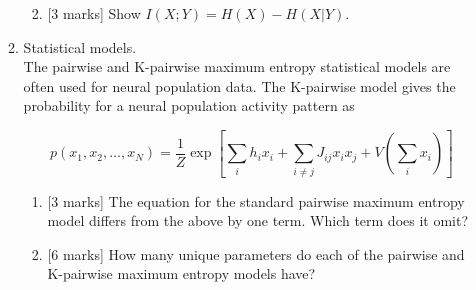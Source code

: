 \documentclass{article}
\newif\ifanswer
\begin{document}
\begin{enumerate}
\begin{enumerate}
\begin{enumerate}
  \fi

\item{}[3 marks] Show $I(X;Y)=H(X)-H(X|Y)$.

  \ifanswer \textbf{Answer}:\\
  So we start with the definition of the mutual information
  \begin{equation}
    I(X;Y)=\sum_{x,y} p(x,y)\log{\frac{p(x,y)}{p(x)p(y)}}
  \end{equation}
  and then write $p(x,y)=p(x|y)p(y)$ giving
    \begin{eqnarray}
    I(X;Y)&=&\sum_{x,y} p(x,y)\log{\frac{p(x|y)}{p(x)}}\cr &=&\sum_{x,y}p(x,y)\log{p(x|y)}-\sum_{x,y}p(x,y)\log{p(x)}
  \end{eqnarray}
In the first term write $p(x,y)=p(x|y)p(y)$ again to get the definition of $H(X|Y)$ and in the second term sum over $y$ to marginalize $p(x,y)$ to $p(x)$.
  \fi
\end{enumerate}
\item Statistical models.\\

The pairwise and K-pairwise maximum entropy statistical models are often used for neural population data. The K-pairwise model gives the probability for a neural population activity pattern as 

$$
p(x_1,x_2,\ldots,x_N) = \frac{1}{Z}\exp[\sum_i h_i x_i + \sum_{i \neq j} J_{ij} x_i x_j + V(\sum_i x_i)]
$$

  
\begin{enumerate}

\item{}[3 marks] The equation for the standard pairwise maximum entropy model differs from the above by one term. Which term does it omit? 

\ifanswer \textbf{Answer:} The third term on the right hand side $V(\sum_i x_i)$ is omitted from the pairwise model. \fi

\item{}[6 marks] How many unique parameters do each of the pairwise and K-pairwise maximum entropy models have?

\ifanswer \textbf{Answer:} The pairwise model has $N + \frac{N(N-1)}{2}$ parameters, the K-pairwise model has  $N + \frac{N(N-1)}{2} + N + 1$ parameters. In each case the first $N$ parameters correspond to each of the individual neuron biases, the $h_i$'s. The second set of parameters are the pairwise couplings, $J_{ij}$'s. There is one of these for every possible pair of neurons. The division by two is because the couplings are symmetric, so $J_{ij}=J_{ji}$. And the K-pairwise model has a further $N+1$ parameters, one for each of the possible numbers of neurons simultaneously active, $k=0, k=1, k=2,\ldots,k=N$. [3 marks for each case. In both cases partial marks will be awarded for an approximately right answer that provides some reasoning.] \fi


\end{enumerate}
\end{enumerate}
\end{enumerate}
\end{document}
